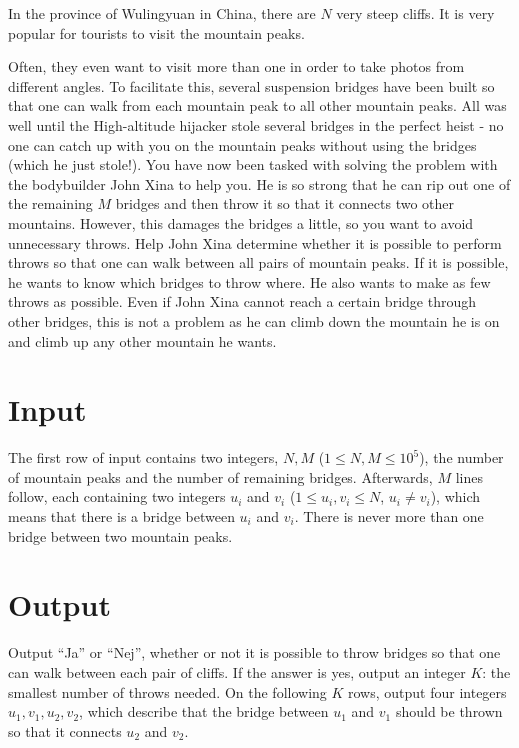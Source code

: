 \noindent
In the province of Wulingyuan in China, there are $N$ very steep cliffs. It is very popular for tourists to visit the mountain peaks.

Often, they even want to visit more than one
in order to take photos from different angles. To facilitate this, several suspension bridges have been built so that one can walk from each mountain peak to all other mountain peaks.
All was well until the High-altitude hijacker stole several bridges in the perfect heist - no one can catch up with you on the mountain peaks without using the bridges (which he just stole!).
You have now been tasked with solving the problem with the bodybuilder John Xina to help you. He is so strong that he can rip out one of the remaining $M$ bridges and then
throw it so that it connects two other mountains. However, this damages the bridges a little, so you want to avoid unnecessary throws. Help John Xina determine whether it is
possible to perform throws so that one can walk between all pairs of mountain peaks. If it is possible, he wants to know which bridges to throw where.
He also wants to make as few throws as possible. Even if John Xina cannot reach a certain bridge through other bridges, this is not a problem as he can climb down
the mountain he is on and climb up any other mountain he wants.

\section*{Input}
\noindent
The first row of input contains two integers, $N,M$ ($1 \leq N,M \leq 10^5$), the number of mountain peaks and the number of remaining bridges.
Afterwards, $M$ lines follow, each containing two integers $u_i$ and $v_i$ ($1 \leq u_i, v_i \leq N$, $u_i \neq v_i$), which means that there is a bridge between
$u_i$ and $v_i$. There is never more than one bridge between two mountain peaks.

\section*{Output}
\noindent
Output ``Ja'' or ``Nej'', whether or not it is possible to throw bridges so that one can walk between each pair of cliffs.
If the answer is yes, output an integer $K$: the smallest number of throws needed.
On the following $K$ rows, output four integers $u_1, v_1, u_2, v_2$,  which describe that the bridge between $u_1$ and $v_1$ should be thrown so that it connects $u_2$ and $v_2$.
